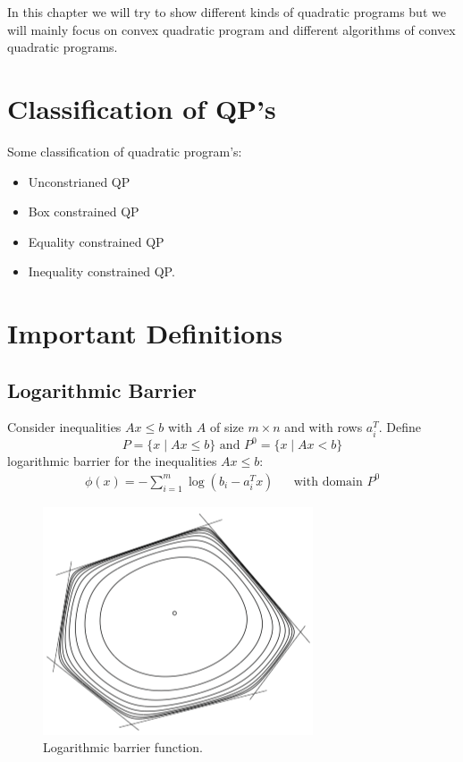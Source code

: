In this chapter we will try to show different kinds of quadratic programs but we will mainly focus on convex quadratic program and different algorithms of convex quadratic programs.

\section{Classification of QP's}

Some classification of quadratic program's:
\begin{itemize}
	\item Unconstrianed QP
	\item Box constrained QP
	\item Equality constrained QP
	\item Inequality constrained QP.
\end{itemize}

\section*{Important Definitions}
\subsection*{Logarithmic Barrier}
Consider inequalities $Ax \leqslant b$ with $A$ of size $m\times n$ and with rows $a_i^T$. Define
\begin{equation*}
P=\lbrace x \mid Ax \leqslant b \rbrace \text{ and } P^0=\lbrace x \mid Ax < b \rbrace
\end{equation*}
logarithmic barrier for the inequalities $Ax\leqslant b$:
\begin{equation*}
\begin{aligned}
	\phi(x) = - \sum_{i=1}^{m}\log(b_i - a_i^Tx) & & \text{with domain } P^0
\end{aligned}	
\end{equation*}
\begin{figure}[h]
\centering
\includegraphics[scale=0.5]{Figures/logarithmic_barrier.png}
\decoRule
\caption[hypercube]{Logarithmic barrier function.}
\label{fig:logarithmic_barrier}
\end{figure}


